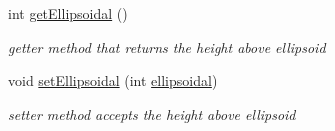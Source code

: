 \begin{DoxyCompactItemize}
int \hyperlink{classcoordinates_1_1_geographic_coordinate_interface_a76520d9a7902acdfe223d848eb784fc1}{get\+Ellipsoidal} ()
\begin{DoxyCompactList}\small\item\em getter method that returns the height above ellipsoid \end{DoxyCompactList}\item 
void \hyperlink{classcoordinates_1_1_geographic_coordinate_interface_a860c713488cf7e9d607c640893d2e4e9}{set\+Ellipsoidal} (int \hyperlink{classcoordinates_1_1_geographic_coordinate_interface_a9e462122f55a06ade4c805d389e432f2}{ellipsoidal})
\begin{DoxyCompactList}\small\item\em setter method accepts the height above ellipsoid \end{DoxyCompactList}\end{DoxyCompactItemize}
